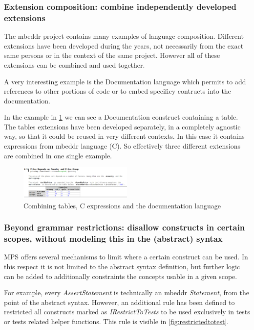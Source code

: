 \documentclass[preprint,numbers,10pt]{sigplanconf}
\begin{document}
\subsubsection{Extension composition: combine independently developed extensions}
\label{evr:langcomp}

The mbeddr project contains many examples of language composition. Different extensions have been developed during the years, not necessarily from the exact same persons or in the context of the same project. However all of these extensions can be combined and used together.

A very interesting example is the Documentation language which permits to add references to other portions of code or to embed specificy contructs into the documentation.

In the example in \ref{fig:extensioncomposition} we can see a Documentation construct containing a table. The tables extensions have been developed separately, in a completely agnostic way, so that it could be reused in very different contexts. In this case it contains expressions from mbeddr language (C). So effectively three different extensions are combined in one single example.

\begin{figure}[H]
	\centering
	\includegraphics[width=0.50\textwidth]{screens/extension_composition.png}
	\caption{Combining tables, C expressions and the documentation language}
	\label{fig:extensioncomposition}
\end{figure}

\subsubsection{Beyond grammar restrictions: disallow constructs in certain scopes, without modeling this in the (abstract) syntax}
\label{evr:beyondgrammar}

MPS offers several mechanisms to limit where a certain construct can be used. In this respect it is not limited to the abstract syntax definition, but further logic can be added to additionally constraints the concepts usable in a given scope.

For example, every \emph{AssertStatement} is technically an mbeddr \emph{Statement}, from the point of the abstract syntax. However, an additional rule has been defined to restricted all constructs marked as \emph{IRestrictToTests} to be used exclusively in tests or tests related helper functions. This rule is visible in \ref{fig:restrictedtotest}.
\end{document}

